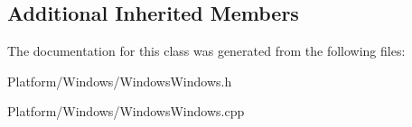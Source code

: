 \subsection*{Additional Inherited Members}


The documentation for this class was generated from the following files\+:\begin{DoxyCompactItemize}
\item 
Platform/\+Windows/Windows\+Windows.\+h\item 
Platform/\+Windows/Windows\+Windows.\+cpp\end{DoxyCompactItemize}
